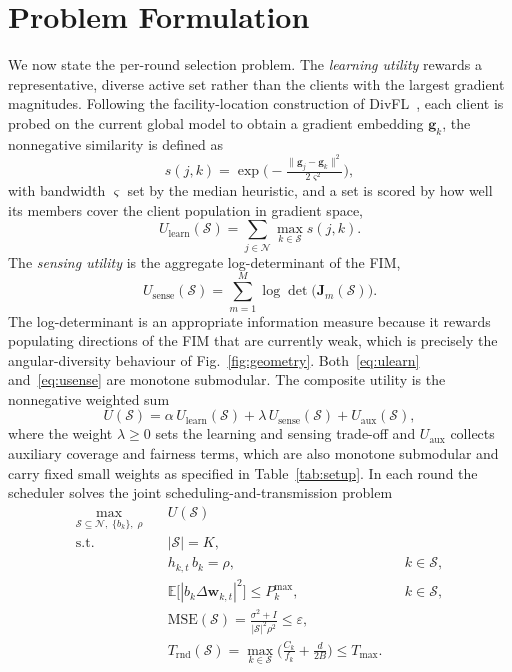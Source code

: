 \documentclass[lettersize,journal]{IEEEtran}
\newcommand{\bw}{\bm{w}}
\newcommand{\bJ}{\bm{J}}
\newcommand{\bg}{\bm{g}}
\newcommand{\calS}{\mathcal{S}}
\newcommand{\calN}{\mathcal{N}}
\newcommand{\logdet}{\log\det}
\begin{document}
\section{Problem Formulation}\label{sec:formulation}
We now state the per-round selection problem. The \emph{learning utility} rewards a representative, diverse active set rather than the clients with the largest gradient magnitudes. Following the facility-location construction of DivFL~\cite{balakrishnan2022divfl}, each client is probed on the current global model to obtain a gradient embedding $\bg_k$, the nonnegative similarity is defined as
\begin{equation}
s(j,k)=\exp\!\Big(-\tfrac{\lVert \bg_j-\bg_k\rVert^{2}}{2\varsigma^{2}}\Big),
\label{eq:sim}
\end{equation}
with bandwidth $\varsigma$ set by the median heuristic, and a set is scored by how well its members cover the client population in gradient space,
\begin{equation}
U_{\mathrm{learn}}(\calS)=\sum_{j\in\calN}\max_{k\in\calS} s(j,k).
\label{eq:ulearn}
\end{equation}
The \emph{sensing utility} is the aggregate log-determinant of the FIM,
\begin{equation}
U_{\mathrm{sense}}(\calS)=\sum_{m=1}^{M}\logdet\!\big(\bJ_m(\calS)\big).
\label{eq:usense}
\end{equation}
The log-determinant is an appropriate information measure because it rewards populating directions of the FIM that are currently weak, which is precisely the angular-diversity behaviour of Fig.~\ref{fig:geometry}. Both~\eqref{eq:ulearn} and~\eqref{eq:usense} are monotone submodular. The composite utility is the nonnegative weighted sum
\begin{equation}
U(\calS)=\alpha\,U_{\mathrm{learn}}(\calS)+\lambda\,U_{\mathrm{sense}}(\calS)
+U_{\mathrm{aux}}(\calS),
\label{eq:composite}
\end{equation}
where the weight $\lambda\ge 0$ sets the learning and sensing trade-off and $U_{\mathrm{aux}}$ collects auxiliary coverage and fairness terms, which are also monotone submodular and carry fixed small weights as specified in Table~\ref{tab:setup}. In each round the scheduler solves the joint scheduling-and-transmission problem
\begin{equation}
\begin{aligned}
\max_{\calS\subseteq\calN,\;\{b_{k}\},\;\rho}\quad & U(\calS)\\
\text{s.t.}\quad
& |\calS|=K, \\
& h_{k,t}\,b_{k}=\rho, && k\in\calS, \\
& \mathbb{E}\big[|b_{k}\Delta\bw_{k,t}|^{2}\big]\le P^{\max}_{k}, && k\in\calS, \\
& \mathrm{MSE}(\calS)=\frac{\sigma^{2}+I}{|\calS|^{2}\rho^{2}}\le\varepsilon, \\
& T_{\mathrm{rnd}}(\calS)=\max_{k\in\calS}\Big(\frac{C_{k}}{f_{k}}+\frac{d}{2B}\Big)\le T_{\max}.
\end{aligned}
\label{eq:problem}
\end{equation}
\end{document}
